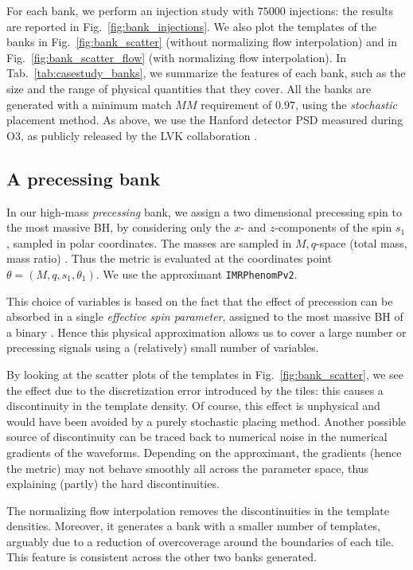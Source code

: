 \documentclass[twocolumn,showpacs,preprintnumbers,nofootinbib,prd,
superscriptaddress,10pt]{revtex4-2}
\begin{document}
For each bank, we perform an injection study with $75000$ injections: the results are reported in Fig.~\ref{fig:bank_injections}. We also plot the templates of the banks in Fig.~\ref{fig:bank_scatter} (without normalizing flow interpolation) and in Fig.~\ref{fig:bank_scatter_flow} (with normalizing flow interpolation).
In Tab.~\ref{tab:casestudy_banks}, we summarize the features of each bank, such as the size and the range of physical quantities that they cover.
All the banks are generated with a minimum match $MM$ requirement of $0.97$, using the {\it stochastic} placement method.
As above, we use the Hanford detector PSD measured during O3, as publicly released by the LVK collaboration \cite{O3a_PSDs}.

\subsection{A precessing bank}\label{sec:precessing_bank}
	
In our high-mass {\it precessing} bank, we assign a two dimensional precessing spin to the most massive BH, by considering only the $x$- and $z$-components of the spin $s_1$, sampled in polar coordinates. The masses are sampled in $M,q$-space (total mass, mass ratio) .  Thus the metric is evaluated at the coordinates point $\theta = (M, q, s_1, \theta_1)$. We use the approximant \texttt{IMRPhenomPv2}.

This choice of variables is based on the fact that the effect of precession can be absorbed in a single {\it effective spin parameter}, assigned to the most massive BH of a binary \cite{PhysRevD.91.024043, PhysRevD.103.083022}. Hence this physical approximation allows us to cover a large number or precessing signals using a (relatively) small number of variables.

By looking at the scatter plots of the templates in Fig.~\ref{fig:bank_scatter}, we see the effect due to the discretization error introduced by the tiles: this causes a discontinuity in the template density. Of course, this effect is unphysical and would have been avoided by a purely stochastic placing method.
Another possible source of discontinuity can be traced back to numerical noise in the numerical gradients of the waveforms. Depending on the approximant, the gradients (hence the metric) may not behave smoothly all across the parameter space, thus explaining (partly) the hard discontinuities.

The normalizing flow interpolation removes the discontinuities in the template densities. Moreover, it generates a bank with a smaller number of templates, arguably due to a reduction of overcoverage around the boundaries of each tile. This feature is consistent across the other two banks generated.
\end{document}
